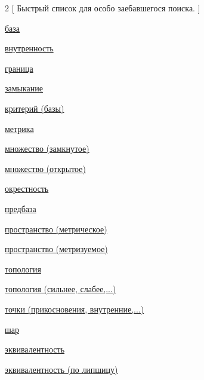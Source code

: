 \documentclass[a4paper,100pt]{article}
\theoremstyle{indented}
\begin{document}
\begin{multicols}{2}
    [
    Быстрый список для особо заебавшегося поиска.
    ]

    \hyperlink{n16}{база}\
    
    \hyperlink{n7}{внутренность}\

    \hyperlink{n9}{граница}\

    \hyperlink{n8}{замыкание}\

    \hyperlink{n17}{критерий (базы)}\
    
    \hyperlink{n1}{метрика}\

    \hyperlink{n6}{множество (замкнутое)}\

    \hyperlink{n4}{множество (открытое)}\

    \hyperlink{n11}{окрестность}\

    \hyperlink{n18}{предбаза}\

    \hyperlink{n2}{пространство (метрическое)}\

    \hyperlink{n15}{пространство (метризуемое)}\

    \hyperlink{n5}{топология}\

    \hyperlink{n12}{топология (сильнее, слабее,...)}\

    \hyperlink{n10}{точки (прикосновения, внутренние,...)}\

    \hyperlink{n3}{шар}\

    \hyperlink{n13}{эквивалентность}\

    \hyperlink{n14}{эквивалентность (по липшицу)}\
    

    \end{multicols}
\end{document}
